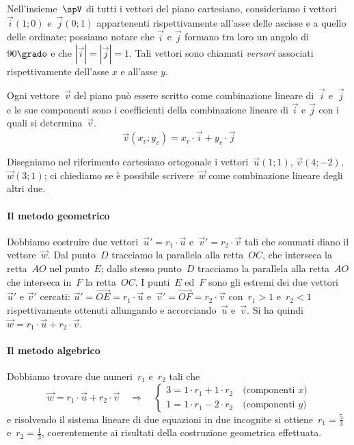 Nell'insieme~$\spV$ di tutti i vettori del piano cartesiano, consideriamo i vettori~$\vec{i}(1;0)$ e~$\vec{j}(0;1)$ appartenenti
rispettivamente all'asse delle ascisse e a quello delle ordinate; possiamo notare che $\vec{i}$ e $\vec{j}$ formano tra loro un angolo di $90\grado$ e che $|\vec{i}|=|\vec{j}|=1$. Tali vettori sono chiamati \emph{versori} associati rispettivamente dell'asse $x$ e all'asse $y$.

Ogni vettore~$\vec{v}$ del piano può essere scritto come combinazione lineare di~$\vec{i}$ e~$\vec{j}$ e le sue componenti sono i coefficienti
della combinazione lineare di $\vec{i}$ e $\vec{j}$ con i quali si determina~$\vec{v}$.
\[\vec{v}(x_v;y_v)=x_v \cdot \vec{i}+y_v \cdot \vec{j}\]

\ovalbox{\risolvi \ref{ese:B.7}}

\begin{exrig}
\begin{esempio}
Disegniamo nel riferimento cartesiano ortogonale i vettori~$\vec{u}(1;1)$, $\vec{v}(4;-2)$, $\vec{w}(3;1)$; ci chiediamo se è possibile scrivere~$\vec{w}$
come combinazione lineare degli altri due.
\begin{center}
 
\end{center}


\paragraph{Il metodo geometrico} Dobbiamo costruire due vettori~$\vec{u}'=r_1 \cdot \vec{u}$ e~$\vec{v}'=r_2 \cdot \vec{v}$ tali che sommati diano
il vettore~$\vec{w}$. Dal punto~$D$ tracciamo la parallela alla retta~$OC$, che interseca la retta~$AO$ nel punto~$E$; dallo stesso punto~$D$
tracciamo la parallela alla retta~$AO$ che interseca in~$F$ la retta~$OC$. I punti~$E$ ed~$F$ sono gli
estremi dei due vettori~$\vec{u}'$ e $\vec{v}'$ cercati: $\vec{u}'=\overrightarrow{OE}=r_1 \cdot \vec{u}$ e~$\vec{v}'=\overrightarrow{OF}=r_2 \cdot \vec{v}$ con~$r_1>1$ e~$r_2<1$ rispettivamente ottenuti
allungando e accorciando~$\vec{u}$ e~$\vec{v}$. Si ha quindi~$\vec{w}=r_1 \cdot \vec{u} + r_2 \cdot \vec{v}$.

\paragraph{Il metodo algebrico} Dobbiamo trovare due numeri~$r_1$ e~$r_2$ tali che
\[ \vec{w}=r_1 \cdot \vec{u}+r_2 \cdot \vec{v} \quad\Rightarrow\quad
\left\{\begin{array}{l}
3=1 \cdot r_1+1 \cdot r_2 \quad\text{(componenti }x\text{)} \\
1=1 \cdot r_1-2 \cdot r_2 \quad\text{(componenti }y\text{)}
\end{array}\right. \]
e risolvendo il sistema lineare di due equazioni in due incognite si ottiene~$r_1=\frac{5}{3}$ e~$r_2=\frac{1}{3}$, coerentemente ai risultati della costruzione geometrica effettuata.
\end{esempio}
\end{exrig}

